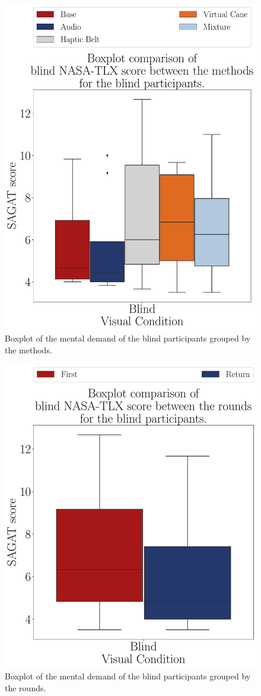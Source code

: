 \begin{figure}[!htb]
    \centering
    \includegraphics[width = 0.75\linewidth]{3 - Resultados/Figuras/boxplot_nasa_blind_scene.pdf}
    \caption{Boxplot of the mental demand of the blind participants grouped by the methods.}
    \label{fig:boxplot_nasa_blind_scene}
\end{figure}    
\begin{figure}[!htb]
    \centering
    \includegraphics[width = 0.75\linewidth]{3 - Resultados/Figuras/boxplot_nasa_blind_rounds.pdf}
    \caption{Boxplot of the mental demand of the blind participants grouped by the rounds.}
    \label{fig:boxplot_nasa_blind_rounds}
\end{figure}

